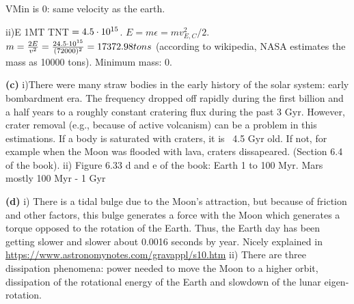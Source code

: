 VMin is 0: same velocity as the earth.

ii)E 1MT TNT $ = 4.5\cdot10^{15}$. $E = m \epsilon = m v_{E,C}^2 /2$. $m = \frac{2E}{v^2} =    \frac{24.5\cdot10^{15}}{(72000)^2} = 17372.98 tons$ (according to wikipedia, NASA estimates the mass as 10000 tons). Minimum mass: 0.


\textbf{(c)} i)There were many straw bodies in the early history of the solar system: early bombardment era. The frequency dropped off rapidly during the first billion and a half years to a roughly constant cratering flux during the past 3 Gyr. However, crater removal (e.g., because of active volcanism) can be a problem in this estimations. If a body is saturated with craters, it is ~4.5 Gyr old. If not, for example when the Moon was flooded with lava, craters dissapeared. (Section 6.4 of the book). ii) Figure 6.33 d and e of the book: Earth 1 to 100 Myr. Mars mostly 100 Myr - 1 Gyr



\textbf{(d)} i) There is a tidal bulge due to the Moon's attraction, but because of friction and other factors, this bulge generates a force with the Moon which generates a torque opposed to the rotation of the Earth. Thus, the Earth day has been getting slower and slower about 0.0016 seconds by year. Nicely explained in \url{https://www.astronomynotes.com/gravappl/s10.htm} ii) There are three dissipation phenomena: power needed to move the Moon to a higher orbit, dissipation of the rotational energy of the Earth and slowdown of the lunar eigen-rotation.





